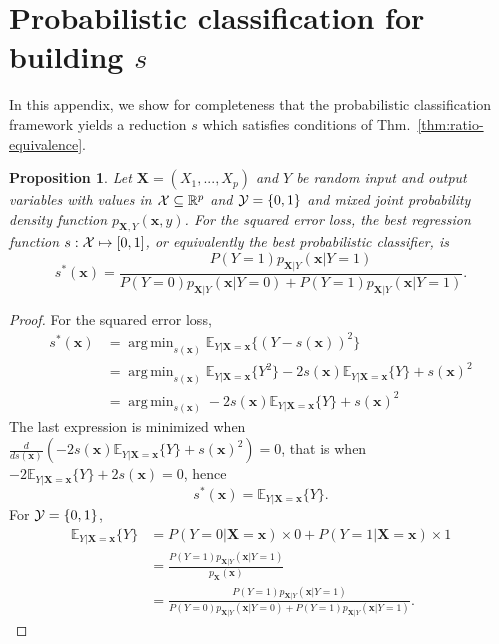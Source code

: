\documentclass[12pt]{article}
\DeclareMathOperator*{\argmin}{arg\,min}
\numberwithin{equation}{section}
\theoremstyle{plain}
\newtheorem{proposition}[theorem]{Proposition}
\begin{document}



\appendix

\section{Probabilistic classification for building $s$}
\label{app:clf-for-s}

In this appendix, we show for completeness that the probabilistic classification framework
yields a reduction $s$ which satisfies conditions of Thm.~\ref{thm:ratio-equivalence}.

\begin{proposition} \label{thm:best-classifier}
Let $\mathbf{X} = (X_1, ..., X_p)$ and $Y$ be random input and output variables
with values in ${\cal X} \subseteq \mathbb{R}^p$
and ${\cal Y} = \{0, 1\}$ and mixed joint probability density  function
$p_{\mathbf{X},Y}(\mathbf{x}, y)$. For the squared error loss, the best
regression function $s : {\cal X} \mapsto [0, 1]$, or equivalently the best
probabilistic classifier, is
\begin{equation}
s^*(\mathbf{x}) = \frac{P(Y=1) p_{\mathbf{X}|Y}(\mathbf{x}|Y=1)}{P(Y=0) p_{\mathbf{X}|Y}(\mathbf{x} | Y=0) + P(Y=1) p_{\mathbf{X}|Y}(\mathbf{x} | Y=1)}.
\end{equation}
\end{proposition}

\begin{proof}
For the squared error loss,
\begin{align}
s^*(\mathbf{x}) &= \argmin_{s(\mathbf{x})} \mathbb{E}_{Y|\mathbf{X}=\mathbf{x}} \{ (Y - s(\mathbf{x}))^2 \} \nonumber \\
&=  \argmin_{s(\mathbf{x})} \mathbb{E}_{Y|\mathbf{X}=\mathbf{x}} \{ Y^2 \} - 2s(\mathbf{x}) \mathbb{E}_{Y|\mathbf{X}=\mathbf{x}} \{ Y \} + s(\mathbf{x})^2 \nonumber \\
&=  \argmin_{s(\mathbf{x})} -2s(\mathbf{x}) \mathbb{E}_{Y|\mathbf{X}=\mathbf{x}} \{ Y \} + s(\mathbf{x})^2
\end{align}
The last expression is minimized when $\frac{d}{ds(\mathbf{x})} (-2s(\mathbf{x}) \mathbb{E}_{Y|\mathbf{X}=\mathbf{x}} \{ Y \} + s(\mathbf{x})^2) = 0$,
that is when $-2 \mathbb{E}_{Y|\mathbf{X}=\mathbf{x}} \{ Y \} + 2 s(\mathbf{x}) = 0$, hence
\begin{equation}
s^*(\mathbf{x}) = \mathbb{E}_{Y|\mathbf{X}=\mathbf{x}} \{ Y \}.
\end{equation}
For ${\cal Y} = \{ 0, 1 \}$,
\begin{align}
\mathbb{E}_{Y|\mathbf{X}=\mathbf{x}} \{ Y \} &= P(Y=0|\mathbf{X}=\mathbf{x}) \times 0 +  P(Y=1|\mathbf{X}=\mathbf{x}) \times 1 \nonumber \\
&= \frac{P(Y=1) p_{\mathbf{X}|Y}(\mathbf{x}|Y=1)}{p_{\mathbf{X}}(\mathbf{x})} \nonumber \\
&= \frac{P(Y=1) p_{\mathbf{X}|Y}(\mathbf{x}|Y=1)}{P(Y=0) p_{\mathbf{X}|Y}(\mathbf{x} | Y=0) + P(Y=1) p_{\mathbf{X}|Y}(\mathbf{x} | Y=1)}.
\end{align}
\end{proof}
\end{document}
